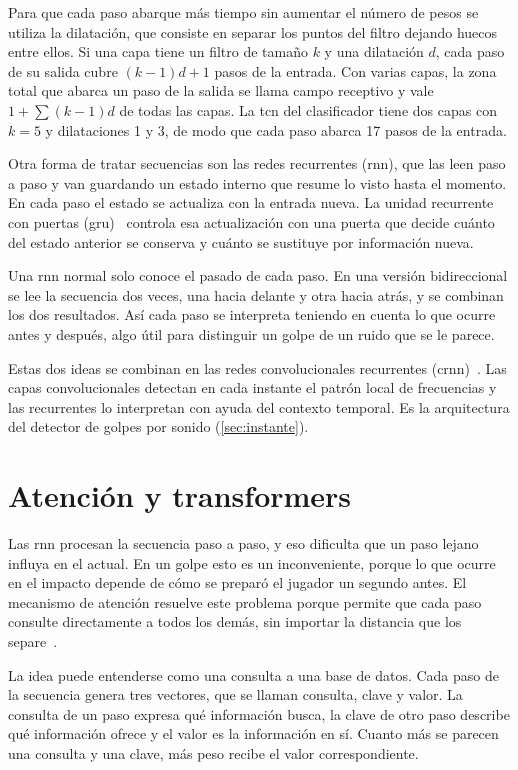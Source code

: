 Para que cada paso abarque más tiempo sin aumentar el número de pesos se utiliza la dilatación, que consiste en separar los puntos del filtro dejando huecos entre ellos.
Si una capa tiene un filtro de tamaño $k$ y una dilatación $d$, cada paso de su salida cubre $(k-1)d+1$ pasos de la entrada.
Con varias capas, la zona total que abarca un paso de la salida se llama campo receptivo y vale $1 + \sum (k-1)d$ de todas las capas.
La \acs{tcn} del clasificador tiene dos capas con $k = 5$ y dilataciones 1 y 3, de modo que cada paso abarca 17 pasos de la entrada.

Otra forma de tratar secuencias son las redes recurrentes (\acs{rnn}), que las leen paso a paso y van guardando un estado interno que resume lo visto hasta el momento.
En cada paso el estado se actualiza con la entrada nueva.
La unidad recurrente con puertas (\acs{gru})~\cite{cho2014gru} controla esa actualización con una puerta que decide cuánto del estado anterior se conserva y cuánto se sustituye por información nueva.

Una \acs{rnn} normal solo conoce el pasado de cada paso.
En una versión bidireccional se lee la secuencia dos veces, una hacia delante y otra hacia atrás, y se combinan los dos resultados.
Así cada paso se interpreta teniendo en cuenta lo que ocurre antes y después, algo útil para distinguir un golpe de un ruido que se le parece.

Estas dos ideas se combinan en las redes convolucionales recurrentes (\acs{crnn})~\cite{adavanne2017sed}.
Las capas convolucionales detectan en cada instante el patrón local de frecuencias y las recurrentes lo interpretan con ayuda del contexto temporal.
Es la arquitectura del detector de golpes por sonido (\cref{sec:instante}).

\section{Atención y transformers}
\label{sec:fund-atencion}

Las \acs{rnn} procesan la secuencia paso a paso, y eso dificulta que un paso lejano influya en el actual.
En un golpe esto es un inconveniente, porque lo que ocurre en el impacto depende de cómo se preparó el jugador un segundo antes.
El mecanismo de atención resuelve este problema porque permite que cada paso consulte directamente a todos los demás, sin importar la distancia que los separe~\cite{vaswani2017attention}.

La idea puede entenderse como una consulta a una base de datos.
Cada paso de la secuencia genera tres vectores, que se llaman consulta, clave y valor.
La consulta de un paso expresa qué información busca, la clave de otro paso describe qué información ofrece y el valor es la información en sí.
Cuanto más se parecen una consulta y una clave, más peso recibe el valor correspondiente.

